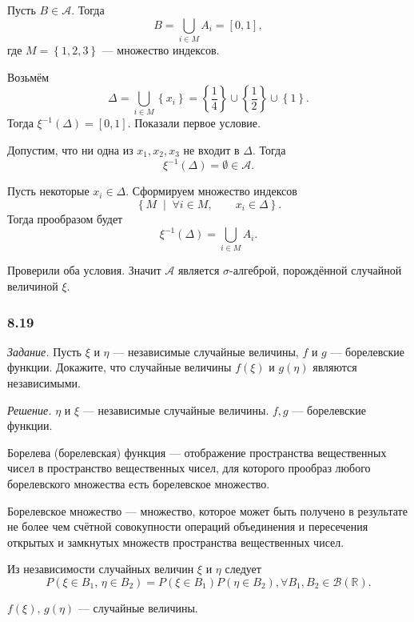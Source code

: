 \begin{enumerate}[label=\alph*)]
Пусть $B \in \mathcal{A} $.
Тогда
$$B =
\bigcup \limits_{i \in M} A_i =
\left[0, 1 \right],$$
где $M = \left\{ 1, 2, 3 \right\} $ --- множество индексов.

Возьмём
$$ \Delta =
\bigcup \limits_{i \in M} \left\{ x_i \right\} =
\left\{ \frac{1}{4} \right\} \cup \left\{ \frac{1}{2} \right\} \cup \left\{ 1 \right\}.$$
Тогда $ \xi^{-1} \left( \Delta \right) =\left[ 0, 1 \right] $.
Показали первое условие.

Допустим, что ни одна из $x_1, x_2, x_3$ не входит в $ \Delta $.
Тогда
$$ \xi^{-1} \left( \Delta \right) =
\emptyset \in
\mathcal{A}.$$

Пусть некоторые $x_i \in \Delta $.
Сформируем множество индексов
$$ \left\{ M \; \middle| \; \forall i \in M, \qquad x_i \in \Delta \right\}.$$
Тогда прообразом будет
$$ \xi^{-1} \left( \Delta \right) =
\bigcup \limits_{i \in M} A_i.$$

Проверили оба условия.
Значит $ \mathcal{A} $ является $ \sigma $-алгеброй, порождённой случайной величиной $ \xi $.
\end{enumerate}

\subsubsection*{8.19}

\textit{Задание.} Пусть $ \xi $ и $ \eta $ --- независимые случайные величины, $f$ и $g$ --- борелевские функции.
Докажите, что случайные величины $f \left( \xi \right) $ и $g \left( \eta \right) $ являются независимыми.

\textit{Решение.} $ \eta $ и $ \xi $ --- независимые случайные величины.
$f, g$ --- борелевские функции.

Борелева (борелевская) функция ---
отображение пространства вещественных чисел в пространство вещественных чисел,
для которого прообраз любого борелевского множества есть борелевское множество.

Борелевское множество --- множество, которое может быть получено в результате не более чем счётной совокупности операций объединения и пересечения открытых и замкнутых множеств пространства вещественных чисел.

Из независимости случайных величин $ \xi $ и $ \eta $ следует
$$ P \left( \xi \in B_1, \, \eta \in B_2 \right) =
P \left( \xi \in B_1 \right) P \left( \eta \in B_2 \right),
\forall B_1, B_2 \in \mathcal{B} \left( \mathbb{R} \right).$$

$f \left( \xi \right), \, g \left( \eta \right) $ --- случайные величины.

